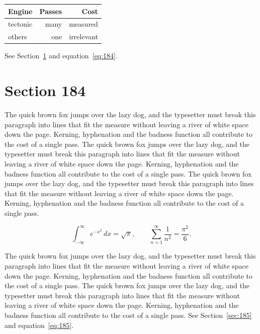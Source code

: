 \documentclass{article}
\begin{document}
\begin{center}
\begin{tabular}{lrr}
\toprule
Engine & Passes & Cost \\
\midrule
tectonic & many & measured \\
others & one & irrelevant \\
\bottomrule
\end{tabular}
\end{center}

See Section~\ref{sec:184} and equation~\eqref{eq:184}.
\section{Section 184}
\label{sec:184}
The quick brown fox jumps over the lazy dog, and the typesetter must break this paragraph into lines that fit the measure without leaving a river of white space down the page. Kerning, hyphenation and the badness function all contribute to the cost of a single pass. The quick brown fox jumps over the lazy dog, and the typesetter must break this paragraph into lines that fit the measure without leaving a river of white space down the page. Kerning, hyphenation and the badness function all contribute to the cost of a single pass. The quick brown fox jumps over the lazy dog, and the typesetter must break this paragraph into lines that fit the measure without leaving a river of white space down the page. Kerning, hyphenation and the badness function all contribute to the cost of a single pass. 

\begin{equation}\label{eq:184}
\int_{-\infty}^{\infty} e^{-x^{2}}\,dx = \sqrt{\pi}, \qquad
\sum_{n=1}^{\infty} \frac{1}{n^{2}} = \frac{\pi^{2}}{6}.
\end{equation}

The quick brown fox jumps over the lazy dog, and the typesetter must break this paragraph into lines that fit the measure without leaving a river of white space down the page. Kerning, hyphenation and the badness function all contribute to the cost of a single pass. The quick brown fox jumps over the lazy dog, and the typesetter must break this paragraph into lines that fit the measure without leaving a river of white space down the page. Kerning, hyphenation and the badness function all contribute to the cost of a single pass. 
See Section~\ref{sec:185} and equation~\eqref{eq:185}.
\end{document}
